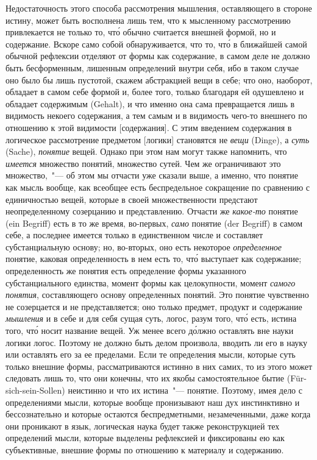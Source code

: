 Недостаточность этого способа рассмотрения мышления,
оставляющего в стороне истину, может быть восполнена
лишь тем, что к мысленному рассмотрению привлекается
не только то, чт\'о обычно считается внешней формой,
но и содержание. Вскоре само собой обнаруживается,
что то, чт\'о в ближайшей самой обычной рефлексии отделяют
от формы как содержание, в самом деле не должно
быть бесформенным, лишенным определений внутри себя,
ибо в таком случае оно было бы лишь пустотой, скажем
абстракцией вещи в себе; что оно, наоборот, обладает в
самом себе формой и, более того, только благодаря ей
одушевлено и обладает содержимым (Gehalt), и что именно
она сама превращается лишь в видимость некоего содержания,
а тем самым и в видимость чего-то внешнего
по отношению к этой видимости [содержания]. С этим
введением содержания в логическое рассмотрение предметом
[логики] становятся не \emph{вещи} (Dinge), а \emph{суть}
(Sache), \emph{понятие} вещей. Однако при этом нам могут также
напомнить, что \emph{имеется} множество понятий, множество
сутей. Чем же ограничивают это множество,~"--- об
этом мы отчасти уже сказали выше, а именно, что понятие
как мысль вообще, как всеобщее есть беспредельное сокращение
по сравнению с единичностью вещей, которые в своей
множественности предстают неопределенному созерцанию
и представлению. Отчасти же \emph{какое-то} понятие (ein Begriff)
есть в то же время, во-первых, \emph{само} понятие (der
Begriff) в самом себе, а последнее имеется только в единственном
числе и составляет субстанциальную основу; но,
во-вторых, оно есть некоторое \emph{определенное} понятие, каковая
определенность в нем есть то, чт\'о выступает как
содержание; определенность же понятия есть определение
формы указанного субстанциального единства, момент
формы как целокупности, момент \emph{самого понятия}, составляющего
основу определенных понятий. Это понятие чувственно
не созерцается и не представляется; оно только
предмет, продукт и содержание \emph{мышления} и в себе и для
себя сущая суть, логос, разум того, чт\'о есть, истина того,
чт\'о носит название вещей. Уж менее всего д\'олжно оставлять
вне науки логики логос. Поэтому не должно быть
делом произвола, вводить ли его в науку или оставлять его
за ее пределами. Если те определения мысли, которые суть
только внешние формы, рассматриваются истинно в них
самих, то из этого может следовать лишь то, что они конечны,
что их якобы самостоятельное бытие (Für-sich-sein-Sollen)
неистинно и что их истина~"--- понятие. Поэтому,
имея дело с определениями мысли, которые вообще
пронизывают наш дух инстинктивно и бессознательно и
которые остаются беспредметными, незамеченными, даже
когда они проникают в язык, логическая наука будет также
реконструкцией тех определений мысли, которые выделены
рефлексией и фиксированы ею как субъективные,
внешние формы по отношению к материалу и содержанию.

